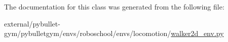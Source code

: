 The documentation for this class was generated from the following file\+:\begin{DoxyCompactItemize}
\item 
external/pybullet-\/gym/pybulletgym/envs/roboschool/envs/locomotion/\hyperlink{roboschool_2envs_2locomotion_2walker2d__env_8py}{walker2d\+\_\+env.\+py}\end{DoxyCompactItemize}
